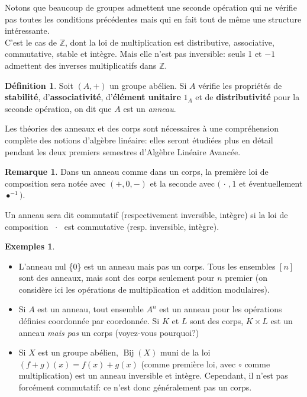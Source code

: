 \documentclass[oneside,12pt,french,table]{book}
\DeclareMathOperator{\Bij}{Bij}
\newcommand{\Z}{\mathbb{Z}}
\theoremstyle{definition}
\theoremstyle{definition}
\newtheorem*{examples}{Exemples}
\theoremstyle{definition}
\newtheorem{definition}{Définition}[chapter]
\newtheorem*{remark}{Remarque}
\begin{document}
\noindent
Notons que beaucoup de groupes admettent une seconde opération qui ne vérifie pas toutes les conditions précédentes mais qui en fait tout de même une structure intéressante. \\
C'est le cas de $\Z$, dont la loi de multiplication est distributive, associative, commutative, stable et intègre. Mais elle n'est pas inversible: seuls 1 et $-1$ admettent des inverses multiplicatifs dans $\Z$.
\begin{definition}
Soit $(A,+)$ un groupe abélien. Si $A$ vérifie les propriétés de \textbf{stabilité}, d'\textbf{associativité}, d'\textbf{élément unitaire} $1_A$ et de \textbf{distributivité} pour la seconde opération, on dit que $A$ est un \textit{anneau}.
\end{definition}
Les théories des anneaux et des corps sont nécessaires à une compréhension complète des notions d'algèbre linéaire: elles seront étudiées plus en détail pendant les deux premiers semestres d'Algèbre Linéaire Avancée.
\begin{remark}
Dans un anneau comme dans un corps, la première loi de composition sera notée avec $(+,0,-)$ et la seconde avec $(\, \cdot \, , 1$ et éventuellement $\bullet^{-1})$.
\end{remark}
Un anneau sera dit commutatif (respectivement inversible, intègre) si la loi de composition \, $\cdot$ \, est commutative (resp. inversible, intègre).
\begin{examples} \hspace{1em} \\
\begin{itemize}
    \item L'anneau nul \{0\} est un anneau mais pas un corps. Tous les ensembles $[n]$ sont des anneaux, mais sont des corps seulement pour $n$ premier (on considère ici les opérations de multiplication et addition modulaires).
    \item Si $A$ est un anneau, tout ensemble $A^n$ est un anneau pour les opérations définies coordonnée par coordonnée. Si $K$ et $L$ sont des corps, $K \times L$ est un anneau \textit{mais pas} un corps (voyez-vous pourquoi?)
    \item Si $X$ est un groupe abélien, $\Bij(X)$ muni de la loi $(f + g)(x) = f(x) + g(x)$ (comme première loi, avec $\circ$ comme multiplication) est un anneau inversible et intègre. Cependant, il n'est pas forcément commutatif: ce n'est donc généralement pas un corps.
\end{itemize}
\end{examples}
\end{document}
